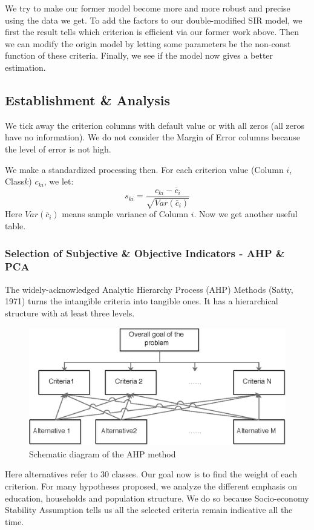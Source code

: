 \documentclass{mcmthesis}
\begin{document}
We try to make our former model become more and more robust and precise using the data we get.  To add the factors to our double-modified SIR model, we first the result tells which criterion is efficient via our former work above. Then we can modify the origin model by letting some parameters be the non-const function of these criteria. Finally, we see if the model now gives a better estimation.
\subsection{Establishment \& Analysis}
We tick away the criterion columns with default value or with all zeros (all zeros have no information). We do not consider the Margin of Error columns because the level of error is not high.

We make a standardized processing then. For each criterion value (Column $i$, Class$k$) $c_{ki}$, we let:
$$s_{ki}=\dfrac{c_{ki}-\overline{c}_i}{\sqrt{Var(\overline{c}_i)}}$$
Here $Var(\overline{c}_i)$ means sample variance of Column $i$. Now we get another useful table.
\subsubsection{Selection of Subjective \& Objective Indicators - AHP \& PCA}
The widely-acknowledged Analytic Hierarchy Process (AHP) Methods (Satty, 1971) turns the intangible criteria into tangible ones. It has a hierarchical structure with at least three levels.

\begin{figure}[htbp!]
\centering
	\includegraphics{1}
	\caption{Schematic diagram of the AHP method}
\end{figure}

Here alternatives refer to 30 classes. Our goal now is to find the weight of each criterion. For many hypotheses proposed, we analyze the different emphasis on education, households and population structure. We do so because Socio-economy Stability Assumption tells us all the selected criteria remain indicative all the time.
\end{document}
